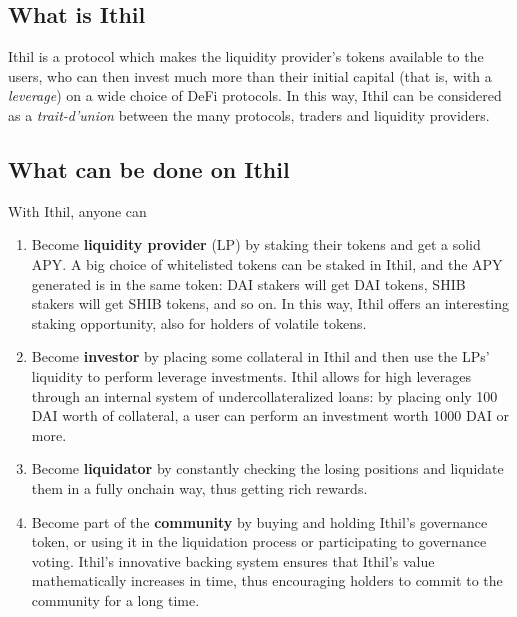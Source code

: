 \documentclass[a4paper,10 pt]{article}
\theoremstyle{definition}
\begin{document}
\subsection{What is Ithil}
Ithil is a protocol which makes the liquidity provider's tokens available to the users, who can then invest much more than their initial capital (that is, with a {\it leverage}) on a wide choice of DeFi protocols. In this way, Ithil can be considered as a {\it trait-d'union} between the many protocols, traders and liquidity providers.

\subsection{What can be done on Ithil}
With Ithil, anyone can
\begin{enumerate}
\item Become {\bf liquidity provider} (LP) by staking their tokens and get a solid APY. A big choice of whitelisted tokens can be staked in Ithil, and the APY generated is in the same token: DAI stakers will get DAI tokens, SHIB stakers will get SHIB tokens, and so on. In this way, Ithil offers an interesting staking opportunity, also for holders of volatile tokens.
\item Become {\bf investor} by placing some collateral in Ithil and then use the LPs' liquidity to perform leverage investments. Ithil allows for high leverages through an internal system of undercollateralized loans: by placing only 100 DAI worth of collateral, a user can perform an investment worth 1000 DAI or more.
\item Become {\bf liquidator} by constantly checking the losing positions and liquidate them in a fully onchain way, thus getting rich rewards.
\item Become part of the {\bf community} by buying and holding Ithil's governance token, or using it in the liquidation process or participating to governance voting. Ithil's innovative backing system ensures that Ithil's value mathematically increases in time, thus encouraging holders to commit to the community for a long time.
\end{enumerate}
\end{document}
